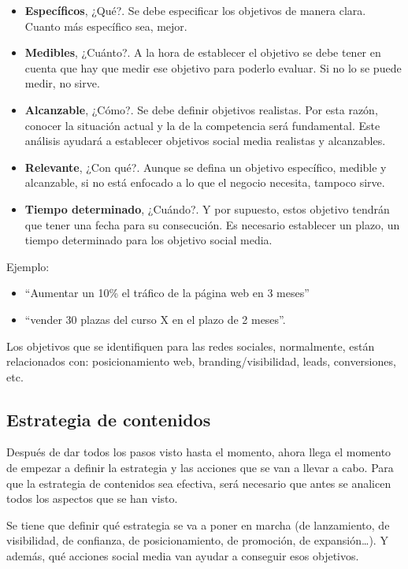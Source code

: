 \begin{itemize}
    \item \textbf{Específicos}, ¿Qué?. Se debe especificar los objetivos de manera clara. Cuanto más específico sea, mejor.
    \item \textbf{Medibles}, ¿Cuánto?. A la hora de establecer el objetivo se debe tener en cuenta que hay que medir ese objetivo para poderlo evaluar. Si no lo se puede medir, no sirve.
    \item \textbf{Alcanzable}, ¿Cómo?. Se debe definir objetivos realistas. Por esta razón, conocer la situación actual y la de la competencia será fundamental. Este análisis ayudará a establecer objetivos social media realistas y alcanzables. 
    \item \textbf{Relevante}, ¿Con qué?. Aunque se defina un objetivo específico, medible y alcanzable, si no está enfocado a lo que el negocio necesita, tampoco sirve.
    \item \textbf{Tiempo determinado}, ¿Cuándo?. Y por supuesto, estos objetivo tendrán que tener una fecha para su consecución. Es necesario establecer un plazo, un tiempo determinado para los objetivo social media.
\end{itemize}

Ejemplo:
\begin{itemize}
    \item “Aumentar un 10\% el tráfico de la página web en 3 meses”
    \item “vender 30 plazas del curso X  en el plazo de 2 meses”.
\end{itemize}

Los objetivos que se identifiquen para las redes sociales, normalmente, están relacionados con: posicionamiento web, branding/visibilidad, leads, conversiones, etc.

\subsection{Estrategia de contenidos}

Después de dar todos los pasos visto hasta el momento, ahora llega el momento de empezar a definir la estrategia y las acciones que se van a llevar a cabo. Para que la estrategia de contenidos sea efectiva, será necesario que antes se analicen todos los aspectos que se han visto.

Se tiene que definir qué estrategia se va a poner en marcha (de lanzamiento, de visibilidad, de confianza, de posicionamiento, de promoción, de expansión…). Y además, qué acciones social media van ayudar a conseguir esos objetivos.

